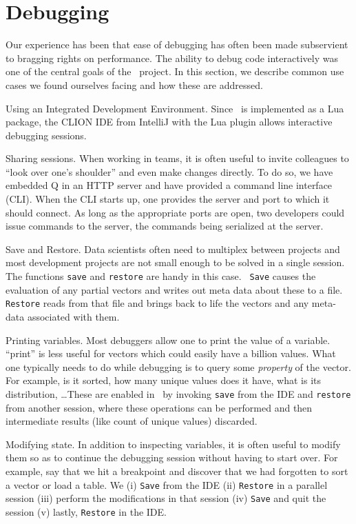 \section{Debugging}
\label{Debugging}

Our experience has been that ease of debugging has often been made
subservient to bragging rights on performance. The ability to debug code
interactively was one of the central goals of the \Q\ project. In this section,
we describe common use cases we found ourselves facing and how these are
addressed.

\be
\item Using an Integrated Development Environment.
Since \Q\ is implemented as a Lua package, the CLION IDE from IntelliJ 
with the Lua plugin allows interactive debugging sessions. 
\item Sharing sessions. When working in teams, it is often useful to invite
colleagues to ``look over one's shoulder'' and even make changes
directly. To do so, we have embedded Q in an HTTP server and have provided a command
line interface (CLI). When the CLI starts up, one provides the server and port
to which it should connect. As long as the appropriate ports are open, two
developers could issue commands to the server, the commands being serialized at the
server. 
\item Save and Restore. Data scientists often need to multiplex between projects
and most development projects are not small enough to be solved in a single
session. The functions {\tt save} and {\tt restore} are handy in this case. {\tt
Save}
causes the evaluation of any partial vectors and writes out meta data about
these to a file. {\tt Restore} reads from that file and brings back to life the
vectors and any meta-data associated with them.

\item Printing variables. Most debuggers allow one to print the value of a
variable. ``print'' is less useful for vectors 
which could easily have a billion values. What one typically needs to do
while debugging is to query some {\it property} of the vector. For example, is it
sorted, how many unique values does it have, what is its distribution,
\ldots These are enabled in \Q\ by invoking {\tt save} from the IDE and
{\tt restore} from another session, where these operations can be performed and
then intermediate results (like count of unique values) discarded.

\item Modifying state. In addition to inspecting variables, it is often useful
  to modify them so as to continue the debugging session without having to
  start over. For example, say that we hit a breakpoint and discover  
  that we had forgotten to sort a vector or load a table. We 
  (i) {\tt Save} from the IDE
  (ii) {\tt Restore} in a parallel session 
  (iii) perform the modifications in that session 
  (iv) {\tt Save} and quit the session 
  (v) lastly, {\tt Restore} in the IDE.

\ee
